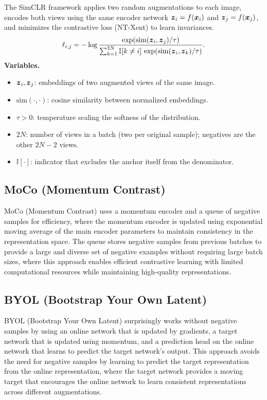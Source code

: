 The SimCLR framework applies two random augmentations to each image, encodes both views using the same encoder network $\boldsymbol{z}_i = f(\boldsymbol{x}_i)$ and $\boldsymbol{z}_j = f(\boldsymbol{x}_j)$, and minimizes the contrastive loss (NT-Xent) to learn invariances.
\begin{equation}
\ell_{i,j} = -\log \frac{\exp(\mathrm{sim}(\boldsymbol{z}_i, \boldsymbol{z}_j)/\tau)}{\sum_{k=1}^{2N} \mathbb{I}[k \neq i] \, \exp(\mathrm{sim}(\boldsymbol{z}_i, \boldsymbol{z}_k)/\tau)}.
\end{equation}
\noindent\textbf{Variables.}
\begin{itemize}[leftmargin=1.5em]
  \item $\boldsymbol{z}_i,\boldsymbol{z}_j$: embeddings of two augmented views of the same image.
  \item $\mathrm{sim}(\cdot,\cdot)$: cosine similarity between normalized embeddings.
  \item $\tau>0$: temperature scaling the softness of the distribution.
  \item $2N$: number of views in a batch (two per original sample); negatives are the other $2N-2$ views.
  \item $\mathbb{I}[\cdot]$: indicator that excludes the anchor itself from the denominator.
\end{itemize}

\subsection{MoCo (Momentum Contrast)}

MoCo (Momentum Contrast) uses a momentum encoder and a queue of negative samples for efficiency, where the momentum encoder is updated using exponential moving average of the main encoder parameters to maintain consistency in the representation space. The queue stores negative samples from previous batches to provide a large and diverse set of negative examples without requiring large batch sizes, where this approach enables efficient contrastive learning with limited computational resources while maintaining high-quality representations.

\subsection{BYOL (Bootstrap Your Own Latent)}

BYOL (Bootstrap Your Own Latent) surprisingly works without negative samples by using an online network that is updated by gradients, a target network that is updated using momentum, and a prediction head on the online network that learns to predict the target network's output. This approach avoids the need for negative samples by learning to predict the target representation from the online representation, where the target network provides a moving target that encourages the online network to learn consistent representations across different augmentations.

